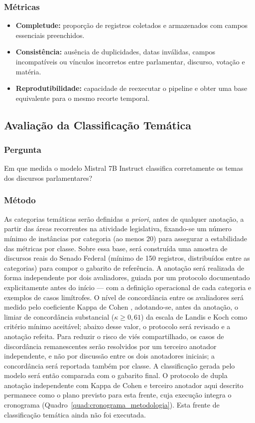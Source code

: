 \subsubsection{Métricas}
\begin{itemize}
    \item \textbf{Completude:} proporção de registros coletados e armazenados com campos essenciais preenchidos.
    \item \textbf{Consistência:} ausência de duplicidades, datas inválidas, campos incompatíveis ou vínculos incorretos entre parlamentar, discurso, votação e matéria.
    \item \textbf{Reprodutibilidade:} capacidade de reexecutar o pipeline e obter uma base equivalente para o mesmo recorte temporal.
\end{itemize}

\subsection{Avaliação da Classificação Temática}

\subsubsection{Pergunta}
Em que medida o modelo Mistral 7B Instruct classifica corretamente os temas dos discursos parlamentares?

\subsubsection{Método}
As categorias temáticas serão definidas \textit{a priori}, antes de qualquer anotação, a partir das áreas recorrentes na atividade legislativa, fixando-se um número mínimo de instâncias por categoria (ao menos 20) para assegurar a estabilidade das métricas por classe. Sobre essa base, será construída uma amostra de discursos reais do Senado Federal (mínimo de 150 registros, distribuídos entre as categorias) para compor o gabarito de referência. A anotação será realizada de forma independente por dois avaliadores, guiada por um protocolo documentado explicitamente antes do início --- com a definição operacional de cada categoria e exemplos de casos limítrofes. O nível de concordância entre os avaliadores será medido pelo coeficiente Kappa de Cohen \cite{Cohen1960}, adotando-se, antes da anotação, o limiar de concordância substancial ($\kappa \geq 0{,}61$) da escala de Landis e Koch \cite{LandisKoch1977} como critério mínimo aceitável; abaixo desse valor, o protocolo será revisado e a anotação refeita. Para reduzir o risco de viés compartilhado, os casos de discordância remanescentes serão resolvidos por um terceiro anotador independente, e não por discussão entre os dois anotadores iniciais; a concordância será reportada também por classe. A classificação gerada pelo modelo será então comparada com o gabarito final. O protocolo de dupla anotação independente com Kappa de Cohen e terceiro anotador aqui descrito permanece como o plano previsto para esta frente, cuja execução integra o cronograma (Quadro~\ref{quad:cronograma_metodologia}). Esta frente de classificação temática ainda não foi executada.

